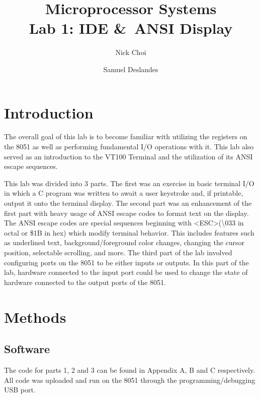 \documentclass[12pt]{article}
\begin{document}
\title{Microprocessor Systems \\ Lab 1: IDE \&\ ANSI Display}
\author{Nick Choi \and Samuel Deslandes}
\date{}
\maketitle

\section{Introduction}
The overall goal of this lab is to become familiar with utilizing the registers on the 8051 as well as performing fundamental I/O operations with it. This lab also served as an introduction to the VT100 Terminal and the utilization of its ANSI escape sequences.

This lab was divided into 3 parts. The first was an exercise in basic terminal I/O in which a C program was written to await a user keystroke and, if printable, output it onto the terminal display. The second part was an enhancement of the first part with heavy usage of ANSI escape codes to format text on the display. The ANSI escape codes are special sequences beginning with \textless ESC\textgreater (\textbackslash033 in octal or \$1B in hex) which modify terminal behavior. This includes features such as underlined text, background/foreground color changes, changing the cursor position, selectable scrolling, and more. The third part of the lab involved configuring ports on the 8051 to be either inputs or outputs. In this part of the lab, hardware connected to the input port could be used to change the state of hardware connected to the output ports of the 8051. 

\section{Methods}
\subsection{Software}
The code for parts 1, 2 and 3 can be found in Appendix A, B and C respectively. All code was uploaded and run on the 8051 through the programming/debugging USB port. 	
\end{document}
